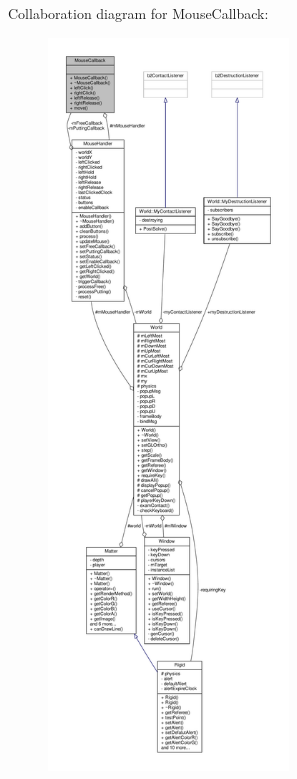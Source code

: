 Collaboration diagram for Mouse\+Callback\+:
\nopagebreak
\begin{figure}[H]
\begin{center}
\leavevmode
\includegraphics[height=550pt]{classMouseCallback__coll__graph}
\end{center}
\end{figure}
